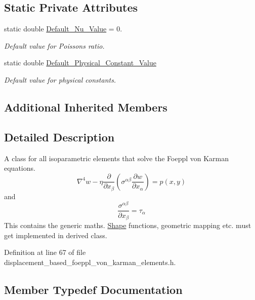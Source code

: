 \subsection*{Static Private Attributes}
\begin{DoxyCompactItemize}
\item 
static double \hyperlink{classoomph_1_1DisplacementBasedFoepplvonKarmanEquations_adf6cf725968deb5c555c1276cc51d83a}{Default\+\_\+\+Nu\+\_\+\+Value} = 0.
\begin{DoxyCompactList}\small\item\em Default value for Poisson\textquotesingle{}s ratio. \end{DoxyCompactList}\item 
static double \hyperlink{classoomph_1_1DisplacementBasedFoepplvonKarmanEquations_afbcb94cced9726c21000fd66088469d7}{Default\+\_\+\+Physical\+\_\+\+Constant\+\_\+\+Value}
\begin{DoxyCompactList}\small\item\em Default value for physical constants. \end{DoxyCompactList}\end{DoxyCompactItemize}
\subsection*{Additional Inherited Members}


\subsection{Detailed Description}
A class for all isoparametric elements that solve the Foeppl von Karman equations. \[ \nabla^4 w - \eta \frac{\partial}{\partial x_{\beta}} \left( \sigma^{\alpha \beta} \frac{\partial w}{\partial x_{\alpha}} \right) = p(x,y) \] and \[ \frac{\sigma^{\alpha \beta}}{\partial x_{\beta}} = \tau_\alpha \] This contains the generic maths. \hyperlink{classoomph_1_1Shape}{Shape} functions, geometric mapping etc. must get implemented in derived class. 

Definition at line 67 of file displacement\+\_\+based\+\_\+foeppl\+\_\+von\+\_\+karman\+\_\+elements.\+h.



\subsection{Member Typedef Documentation}
\mbox{\label{classoomph_1_1DisplacementBasedFoepplvonKarmanEquations_a9d63b92b57e3b521a5a10cecdafc4e65}} 
